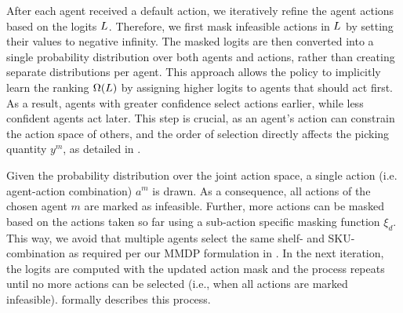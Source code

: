 After each agent received a default action, we iteratively refine the agent actions based on the logits $L$. Therefore, we first mask infeasible actions in $L$ by setting their values to negative infinity. The masked logits are then converted into a single probability distribution over both agents and actions, rather than creating separate distributions per agent. This approach allows the policy to implicitly learn the ranking ${\Omega(L)}$ by assigning higher logits to agents that should act first. As a result, agents with greater confidence select actions earlier, while less confident agents act later. This step is crucial, as an agent's action can constrain the action space of others, and the order of selection directly affects the picking quantity $y^m$, as detailed in .

Given the probability distribution over the joint action space, a single action (i.e. agent-action combination) $a^m$ is drawn. As a consequence, all actions of the chosen agent $m$ are marked as infeasible. Further, more actions can be masked based on the actions taken so far using a sub-action specific masking function $\xi_d$. 
This way, we avoid that multiple agents select the same shelf- and SKU-combination as required per our MMDP formulation in .
In the next iteration, the logits are computed with the updated action mask and the process repeats until no more actions can be selected (i.e., when all actions are marked infeasible).  formally describes this process. 




